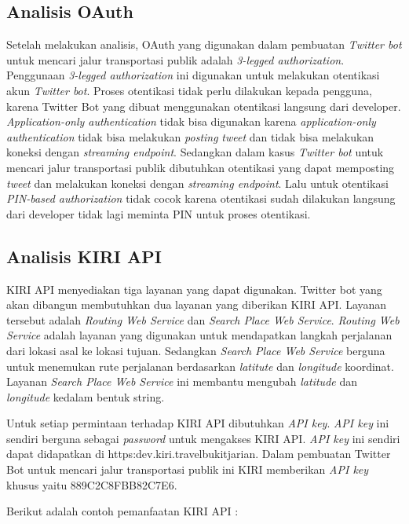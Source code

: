 \subsection{Analisis OAuth}
Setelah melakukan analisis, OAuth yang digunakan dalam pembuatan \textit{Twitter bot} untuk mencari jalur transportasi publik adalah \textit{3-legged authorization}. Penggunaan \textit{3-legged authorization} ini digunakan untuk melakukan otentikasi akun \textit{Twitter bot}. Proses otentikasi tidak perlu dilakukan kepada pengguna, karena Twitter Bot yang dibuat menggunakan otentikasi langsung dari developer. \textit{Application-only authentication} tidak bisa digunakan karena \textit{application-only authentication} tidak bisa melakukan \textit{posting} \textit{tweet} dan tidak bisa melakukan koneksi dengan \textit{streaming endpoint}. Sedangkan dalam kasus \textit{Twitter bot} untuk mencari jalur transportasi publik dibutuhkan otentikasi yang dapat memposting \textit{tweet} dan melakukan koneksi dengan \textit{streaming endpoint}. Lalu untuk otentikasi \textit{PIN-based authorization} tidak cocok karena otentikasi sudah dilakukan langsung dari developer tidak lagi meminta PIN untuk proses otentikasi.

\subsection{Analisis KIRI API}
KIRI API menyediakan tiga layanan yang dapat digunakan. Twitter bot yang akan dibangun membutuhkan dua layanan yang diberikan KIRI API. Layanan tersebut adalah \textit{Routing Web Service} dan \textit{Search Place Web Service}. \textit{Routing Web Service} adalah layanan yang digunakan untuk mendapatkan langkah perjalanan dari lokasi asal ke lokasi tujuan. Sedangkan \textit{Search Place Web Service} berguna untuk menemukan rute perjalanan berdasarkan \textit{latitute} dan \textit{longitude} koordinat. Layanan \textit{Search Place Web Service} ini membantu mengubah \textit{latitude} dan \textit{longitude} kedalam bentuk string.

Untuk setiap permintaan terhadap KIRI API dibutuhkan \textit{API key}. \textit{API key} ini sendiri berguna sebagai \textit{password} untuk mengakses KIRI API. \textit{API key} ini sendiri dapat didapatkan di https:\/\/dev.kiri.travel\/bukitjarian\/. Dalam pembuatan Twitter Bot untuk mencari jalur transportasi publik ini KIRI memberikan \textit{API key} khusus yaitu 889C2C8FBB82C7E6.

Berikut adalah contoh pemanfaatan KIRI API :

